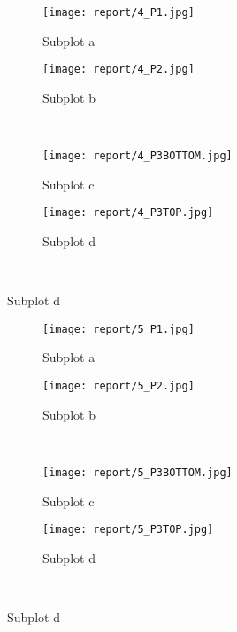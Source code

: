 \documentclass{article}%
\begin{document}
\begin{figure}[h!]%
\caption{ 5HAFTERSTARTFIRE}%
\centering%
\begin{subfigure}{0.45\textwidth}%
\texttt{[image:  report/4\_P1.jpg]}%
\caption{Subplot a}%
\end{subfigure}%
\begin{subfigure}{0.45\textwidth}%
\texttt{[image:  report/4\_P2.jpg]}%
\caption{Subplot b}%
\end{subfigure}%
\\%
\begin{subfigure}{0.45\textwidth}%
\texttt{[image:  report/4\_P3BOTTOM.jpg]}%
\caption{Subplot c}%
\end{subfigure}%
\begin{subfigure}{0.45\textwidth}%
\texttt{[image:  report/4\_P3TOP.jpg]}%
\caption{Subplot d}%
\end{subfigure}%
\\%
\end{figure}

%


\begin{figure}[h!]%
\caption{6HAFTERSTARTFIRE}%
\centering%
\begin{subfigure}{0.45\textwidth}%
\texttt{[image:  report/5\_P1.jpg]}%
\caption{Subplot a}%
\end{subfigure}%
\begin{subfigure}{0.45\textwidth}%
\texttt{[image:  report/5\_P2.jpg]}%
\caption{Subplot b}%
\end{subfigure}%
\\%
\begin{subfigure}{0.45\textwidth}%
\texttt{[image:  report/5\_P3BOTTOM.jpg]}%
\caption{Subplot c}%
\end{subfigure}%
\begin{subfigure}{0.45\textwidth}%
\texttt{[image:  report/5\_P3TOP.jpg]}%
\caption{Subplot d}%
\end{subfigure}%
\\%
\end{figure}

%
\end{document}
